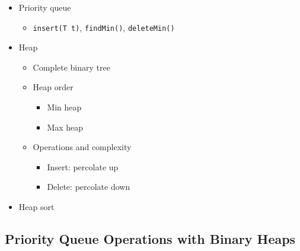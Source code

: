 \documentclass[
  10pt,
  english,
  letterpaper,
,tablecaptionabove
]{scrartcl}
\newcommand{\passthrough}[1]{#1}
\providecommand{\tightlist}{%
  \setlength{\itemsep}{0pt}\setlength{\parskip}{0pt}}
\begin{document}
\begin{itemize}
\tightlist
\item
  Priority queue

  \begin{itemize}
  \tightlist
  \item
    \passthrough{\lstinline!insert(T t)!},
    \passthrough{\lstinline!findMin()!},
    \passthrough{\lstinline!deleteMin()!}
  \end{itemize}
\item
  Heap

  \begin{itemize}
  \tightlist
  \item
    Complete binary tree
  \item
    Heap order

    \begin{itemize}
    \tightlist
    \item
      Min heap
    \item
      Max heap
    \end{itemize}
  \item
    Operations and complexity

    \begin{itemize}
    \tightlist
    \item
      Insert: percolate up
    \item
      Delete: percolate down
    \end{itemize}
  \end{itemize}
\item
  Heap sort
\end{itemize}

\hypertarget{priority-queue-operations-with-binary-heaps}{%
\subsection{Priority Queue Operations with Binary
Heaps}\label{priority-queue-operations-with-binary-heaps}}
\end{document}
